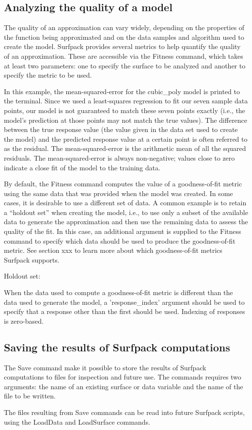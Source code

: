 \documentclass{article}
\begin{document}
\subsection{Analyzing the quality of a model}\label{sec:fitness}
The quality of an approximation can vary widely, depending on the properties of the function being approximated and on the data samples and algorithm used to create the model.  Surfpack provides several metrics to help quantify the quality of an approximation.  These are accessible via the Fitness command, which takes at least two parameters: one to specify the surface to be analyzed and another to specify the metric to be used.

In this example, the mean-squared-error for the cubic\_poly model is printed to the terminal.  Since we used a least-squares regression to fit our seven sample data points, our model is not guaranteed to match these seven points exactly (i.e., the model's prediction at those points may not match the true values).  The difference between the true response value (the value given in the data set used to create the model) and the predicted response value at a certain point is often referred to as the residual.  The mean-squared-error is the arithmetic mean of all the squared residuals.  The mean-squared-error is always non-negative; values close to zero indicate a close fit of the model to the training data.  

By default, the Fitness command computes the value of a goodness-of-fit metric using the same data that was provided when the model was created.  In some cases, it is desirable to use a different set of data.  A common example is to retain a ``holdout set'' when creating the model, i.e., to use only a subset of the available data to generate the approximation and then use the remaining data to assess the quality of the fit.  In this case, an additional argument is supplied to the Fitness command to specify which data should be used to produce the goodness-of-fit metric.  See section xxx to learn more about which goodness-of-fit metrics Surfpack supports.

Holdout set:


When the data used to compute a goodness-of-fit metric is different than the data used to generate the model, a 'response\_index' argument should be used to specify that a response other than the first should be used.  Indexing of responses is zero-based.


\subsection{Saving the results of Surfpack computations}
The Save command make it possible to store the results of Surfpack computations to files for inspection and future use.  The commands requires two arguments: the name of an existing surface or data variable and the name of the file to be written.

The files resulting from Save commands can be read into future Surfpack scripts, using the LoadData and LoadSurface commands.

\end{document}
